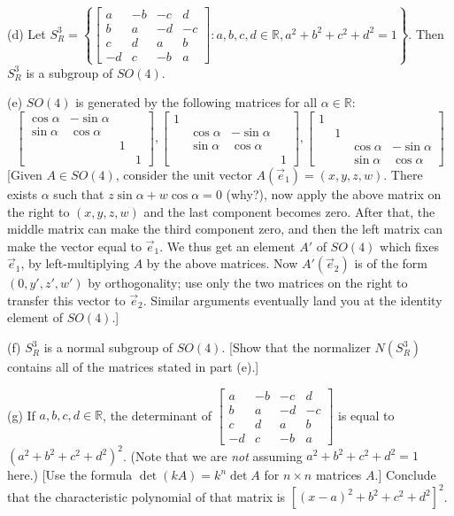 \documentclass[leqno]{book}
\begin{document}
\begin{enumerate}
(d) Let $S^3_R=\left\{\begin{bmatrix}a&-b&-c&d\\b&a&-d&-c\\c&d&a&b\\-d&c&-b&a\end{bmatrix}:a,b,c,d\in\mathbb R,a^2+b^2+c^2+d^2=1\right\}$.  Then $S^3_R$ is a subgroup of $SO(4)$. %

(e) $SO(4)$ is generated by the following matrices for all $\alpha\in\mathbb R$:
$$\begin{bmatrix}\cos\alpha&-\sin\alpha\\\sin\alpha&\cos\alpha\\&&1\\&&&1\end{bmatrix},\begin{bmatrix}1\\&\cos\alpha&-\sin\alpha\\&\sin\alpha&\cos\alpha\\&&&1\end{bmatrix},\begin{bmatrix}1\\&1\\&&\cos\alpha&-\sin\alpha\\&&\sin\alpha&\cos\alpha\end{bmatrix}$$
[Given $A\in SO(4)$, consider the unit vector $A(\vec e_1)=(x,y,z,w)$.  There exists $\alpha$ such that $z\sin\alpha+w\cos\alpha=0$ (why?), now apply the above matrix on the right to $(x,y,z,w)$ and the last component becomes zero.  After that, the middle matrix can make the third component zero, and then the left matrix can make the vector equal to $\vec e_1$.  We thus get an element $A'$ of $SO(4)$ which fixes $\vec e_1$, by left-multiplying $A$ by the above matrices.  Now $A'(\vec e_2)$ is of the form $(0,y',z',w')$ by orthogonality; use only the two matrices on the right to transfer this vector to $\vec e_2$.  Similar arguments eventually land you at the identity element of $SO(4)$.]

(f) $S^3_R$ is a normal subgroup of $SO(4)$.  [Show that the normalizer $N(S^3_R)$ contains all of the matrices stated in part (e).]

(g) If $a,b,c,d\in\mathbb R$, the determinant of $\begin{bmatrix}a&-b&-c&d\\b&a&-d&-c\\c&d&a&b\\-d&c&-b&a\end{bmatrix}$ is equal to $(a^2+b^2+c^2+d^2)^2$.  (Note that we are \emph{not} assuming $a^2+b^2+c^2+d^2=1$ here.)  [Use the formula $\det(kA)=k^n\det A$ for $n\times n$ matrices $A$.]  Conclude that the characteristic polynomial of that matrix is $[(x-a)^2+b^2+c^2+d^2]^2$.


\end{enumerate}
\end{document}
